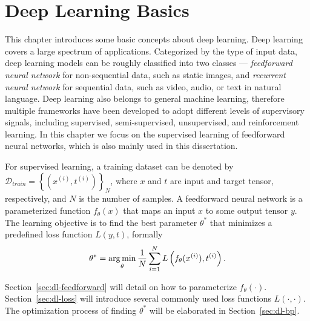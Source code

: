 \chapter{Deep Learning Basics}
\label{ch:deep-learning-basics}

This chapter introduces some basic concepts about deep learning. Deep learning covers a large spectrum of applications. Categorized by the type of input data, deep learning models can be roughly classified into two classes --- \emph{feedforward neural network} for non-sequential data, such as static images, and \emph{recurrent neural network} for sequential data, such as video, audio, or text in natural language. Deep learning also belongs to general machine learning, therefore multiple frameworks have been developed to adopt different levels of supervisory signals, including supervised, semi-supervised, unsupervised, and reinforcement learning. In this chapter we focus on the supervised learning of feedforward neural networks, which is also mainly used in this dissertation.

For supervised learning, a training dataset can be denoted by $\mathcal{D}_{train}=\left\{(x^{(i)}, t^{(i)})\right\}_N$, where $x$ and $t$ are input and target tensor, respectively, and $N$ is the number of samples. A feedforward neural network is a parameterized function $f_\theta(x)$ that maps an input $x$ to some output tensor $y$. The learning objective is to find the best parameter $\theta^*$ that minimizes a predefined loss function $L(y,t)$, formally
\begin{equation}
  \theta^* = \mathop{\mathrm{arg\,min}}_\theta \frac{1}{N} \sum_{i=1}^N L\left(f_\theta(x^{(i)}), t^{(i)}\right).
\end{equation}

Section~\ref{sec:dl-feedforward} will detail on how to parameterize $f_\theta(\cdot)$. Section~\ref{sec:dl-loss} will introduce several commonly used loss functions $L(\cdot,\cdot)$. The optimization process of finding $\theta^*$ will be elaborated in Section~\ref{sec:dl-bp}.





